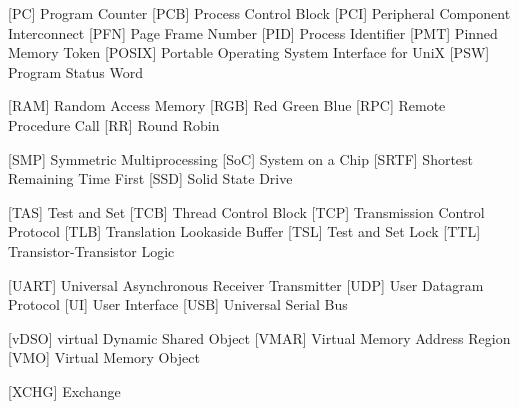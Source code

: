 \begin{acronym} [POSIX]
 [PC] {Program Counter}
 [PCB] {Process Control Block}
 [PCI] {Peripheral Component Interconnect}
 [PFN] {Page Frame Number}
 [PID] {Process Identifier}
 [PMT] {Pinned Memory Token}
 [POSIX] {Portable Operating System Interface for UniX}
 [PSW] {Program Status Word}


  [RAM] {Random Access Memory}
 [RGB] {Red Green Blue}
 [RPC] {Remote Procedure Call}
 [RR] {Round Robin}

 [SMP] {Symmetric Multiprocessing}
 [SoC] {System on a Chip}
 [SRTF] {Shortest Remaining Time First}
 [SSD] {Solid State Drive}

 [TAS] {Test and Set}
 [TCB] {Thread Control Block}
 [TCP] {Transmission Control Protocol}
 [TLB] {Translation Lookaside Buffer}
 [TSL] {Test and Set Lock}
 [TTL] {Transistor-Transistor Logic}

 [UART] {Universal Asynchronous Receiver Transmitter}
 [UDP] {User Datagram Protocol} 
  [UI]  {User Interface}
 [USB] {Universal Serial Bus}

 [vDSO] {virtual Dynamic Shared Object}
 [VMAR] {Virtual Memory Address Region}
  [VMO]  {Virtual Memory Object}


 [XCHG] {Exchange}



\end{acronym} 
